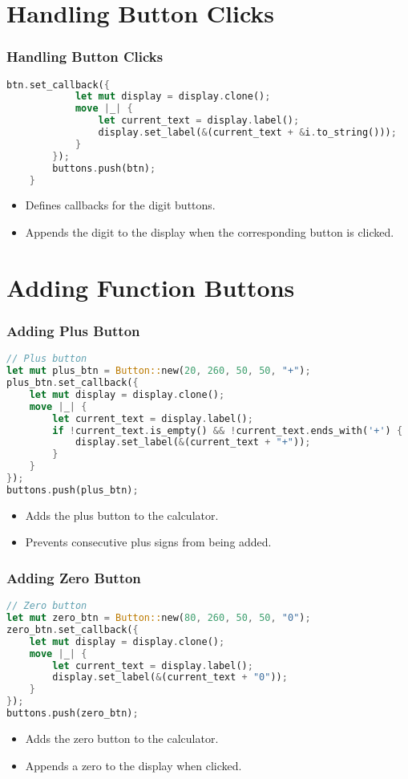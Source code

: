 \documentclass[aspectratio=169, table]{beamer}
\begin{document}
\section{Handling Button Clicks}
\begin{frame}[fragile]
	\frametitle{Handling Button Clicks}
	\begin{lstlisting}[language=Rust]
		btn.set_callback({
			let mut display = display.clone();
			move |_| {
				let current_text = display.label();
				display.set_label(&(current_text + &i.to_string()));
			}
		});
		buttons.push(btn);
	}
\end{lstlisting}
\begin{itemize}
	\item Defines callbacks for the digit buttons.
	\item Appends the digit to the display when the corresponding button is clicked.
\end{itemize}
\end{frame}

\section{Adding Function Buttons}

\begin{frame}[fragile]
\frametitle{Adding Plus Button}
\vspace{15pt}
\begin{lstlisting}[language=Rust]
// Plus button
let mut plus_btn = Button::new(20, 260, 50, 50, "+");
plus_btn.set_callback({
	let mut display = display.clone();
	move |_| {
		let current_text = display.label();
		if !current_text.is_empty() && !current_text.ends_with('+') {
			display.set_label(&(current_text + "+"));
		}
	}
});
buttons.push(plus_btn);
\end{lstlisting}
\begin{itemize}
\item Adds the plus button to the calculator.
\item Prevents consecutive plus signs from being added.
\end{itemize}
\end{frame}

\begin{frame}[fragile]
\frametitle{Adding Zero Button}
\begin{lstlisting}[language=Rust]
// Zero button
let mut zero_btn = Button::new(80, 260, 50, 50, "0");
zero_btn.set_callback({
	let mut display = display.clone();
	move |_| {
		let current_text = display.label();
		display.set_label(&(current_text + "0"));
	}
});
buttons.push(zero_btn);
\end{lstlisting}
\begin{itemize}
\item Adds the zero button to the calculator.
\item Appends a zero to the display when clicked.
\end{itemize}
\end{frame}
\end{document}
